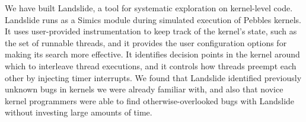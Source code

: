 \documentclass{llncs}
\begin{document}
We have built Landslide, a tool for systematic exploration on kernel-level code. Landslide runs as a Simics module during simulated execution of Pebbles kernels. It uses user-provided instrumentation to keep track of the kernel's state, such as the set of runnable threads, and it provides the user configuration options for making its search more effective. It identifies decision points in the kernel around which to interleave thread executions, and it controls how threads preempt each other by injecting timer interrupts. We found that Landslide identified previously unknown bugs in kernels we were already familiar with, and also that novice kernel programmers were able to find otherwise-overlooked bugs with Landslide without investing large amounts of time.


{}

\end{document}
